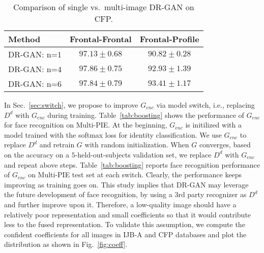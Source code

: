 \documentclass[10pt,journal,compsoc]{IEEEtran}
\begin{document}
\begin{table}[t!]
\small
\caption{\small{Comparison of single vs.~multi-image DR-GAN on CFP.}} 
\vspace{-3mm}
\label{tab:CFP_results_1}
\begin{center}
\begin{tabular}{ lcc}
\toprule 
Method & Frontal-Frontal & Frontal-Profile\\ \midrule
DR-GAN: n=$1$ & $97.13\pm0.68$ & $90.82\pm0.28$ \\ 
DR-GAN: n=$4$ & $97.86\pm0.75$ & $92.93\pm1.39$ \\ 
DR-GAN: n=$6$ & $97.84\pm0.79$ & $93.41\pm1.17$ \\ 
\bottomrule
\end{tabular}
\end{center}
\figvspace
\end{table}\begin{table}[t]
\begin{center}
\caption{\small Performance of  $G_{enc}$ on Multi-PIE when keep switching to $D_{d}$. At Epoch $0$, $G_{enc}$ is trained with only the softmax loss. }
\label{tab:boosting}
\small
{}
\end{center}\figvspace\vspace{-2mm}
\end{table}
In Sec.~\ref{sec:switch}, we propose to improve $G_{enc}$ via model switch, i.e., replacing $D^d$ with $G_{enc}$ during training. 
Table~\ref{tab:boosting} shows the performance of $G_{enc}$ for face recognition on Multi-PIE. 
At the beginning, $G_{enc}$ is initilized with a model trained with the softmax loss for identity classification. 
We use $G_{enc}$ to replace $D^d$ and retrain $G$ with random initialization.
When $G$ converges, based on the accuracy on a $5$-held-out-subjects validation set, we replace $D^d$ with $G_{enc}$ and repeat above steps. 
Table~\ref{tab:boosting} reports face recognition performance of $G_{enc}$ on Multi-PIE test set at each switch. 
Clearly, the performance keeps improving as training goes on.
This study implies that DR-GAN may leverage the future development of face recognition, by using a $3$rd party recognizer as $D^d$ and further improve upon it.
Therefore, a low-quality image should have a relatively poor representation and small coefficients so that it would contribute less to the fused representation.  
To validate this assumption, we compute the confident coefficients for all images in IJB-A and CFP databases and plot the distribution as shown in Fig.~\ref{fig:coeff}.
\end{document}

